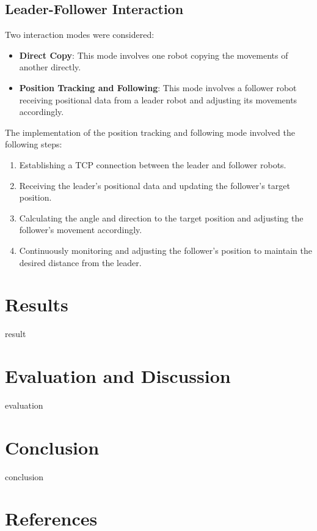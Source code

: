 \documentclass[conference]{IEEEtran}
\begin{document}
\subsection{Leader-Follower Interaction}
Two interaction modes were considered:
\begin{itemize}
    \item \textbf{Direct Copy}: This mode involves one robot copying the movements of another directly.
    \item \textbf{Position Tracking and Following}: This mode involves a follower robot receiving positional data from a leader robot and adjusting its movements accordingly.
\end{itemize}

The implementation of the position tracking and following mode involved the following steps:
\begin{enumerate}
    \item Establishing a TCP connection between the leader and follower robots.
    \item Receiving the leader's positional data and updating the follower's target position.
    \item Calculating the angle and direction to the target position and adjusting the follower's movement accordingly.
    \item Continuously monitoring and adjusting the follower's position to maintain the desired distance from the leader.
\end{enumerate}

\section{Results}
\label{sec:results}
result

\section{Evaluation and Discussion}
\label{sec:evaluation}
evaluation

\section{Conclusion}
\label{sec:conclusion}
conclusion

\section*{References}


\end{document}
